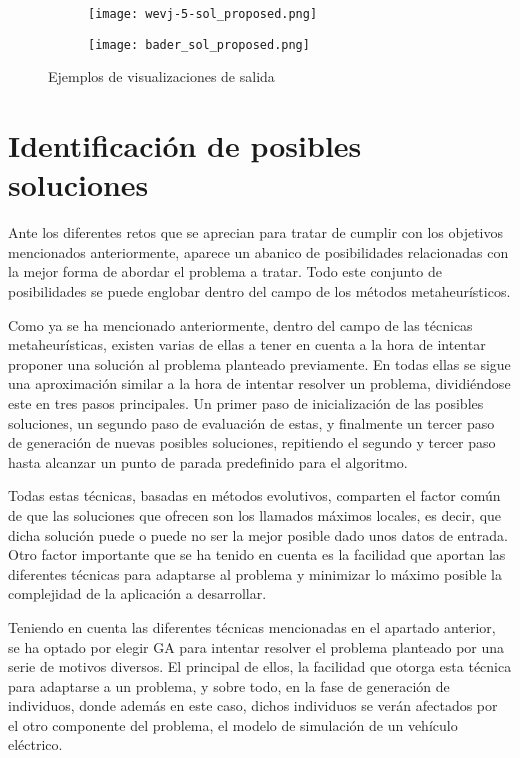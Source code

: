 \documentclass[11pt,spanish,listoffigures,listoftables]{tfgetsinf}
\begin{document}
\begin{figure}[!htb]
    \centering
    \begin{subfigure}[b]{0.95\linewidth}
    \texttt{[image: wevj-5-sol\_proposed.png]}
    \end{subfigure}
    \begin{subfigure}[b]{0.95\linewidth}
    \texttt{[image: bader\_sol\_proposed.png]}
    \end{subfigure}
    \caption{Ejemplos de visualizaciones de salida}
    \label{fig:other_solutions}
\end{figure}

\section{Identificación de posibles soluciones}
Ante los diferentes retos que se aprecian para tratar de cumplir con los objetivos mencionados anteriormente, aparece un abanico de posibilidades relacionadas con la mejor forma de abordar el problema a tratar. Todo este conjunto de posibilidades se puede englobar dentro del campo de los métodos metaheurísticos.

Como ya se ha mencionado anteriormente, dentro del campo de las técnicas metaheurísticas, existen varias de ellas a tener en cuenta a la hora de intentar proponer una solución al problema planteado previamente. En todas ellas se sigue una aproximación similar a la hora de intentar resolver un problema, dividiéndose este en tres pasos principales. Un primer paso de inicialización de las posibles soluciones, un segundo paso de evaluación de estas, y finalmente un tercer paso de generación de nuevas posibles soluciones, repitiendo el segundo y tercer paso hasta alcanzar un punto de parada predefinido para el algoritmo.

Todas estas técnicas, basadas en métodos evolutivos, comparten el factor común de que las soluciones que ofrecen son los llamados máximos locales, es decir, que dicha solución puede o puede no ser la mejor posible dado unos datos de entrada. Otro factor importante que se ha tenido en cuenta es la facilidad que aportan las diferentes técnicas para adaptarse al problema y minimizar lo máximo posible la complejidad de la aplicación a desarrollar.

Teniendo en cuenta las diferentes técnicas mencionadas en el apartado anterior, se ha optado por elegir GA para intentar resolver el problema planteado por una serie de motivos diversos. El principal de ellos, la facilidad que otorga esta técnica para adaptarse a un problema, y sobre todo, en la fase de generación de individuos, donde además en este caso, dichos individuos se verán afectados por el otro componente del problema, el modelo de simulación de un vehículo eléctrico.
\end{document}
